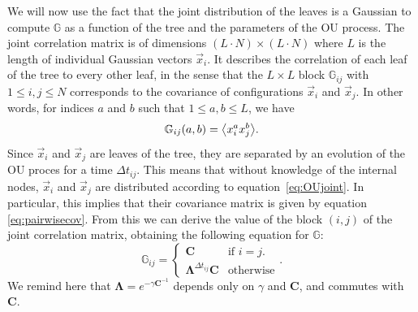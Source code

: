\documentclass[preprint,amsmath,amssymb,superscriptaddress,showpacs,pre]{revtex4-1}
\let\originalleft\left
\let\originalright\right
\renewcommand{\left}{\mathopen{}\mathclose\bgroup\originalleft}
\renewcommand{\right}{\aftergroup\egroup\originalright}
\def\vx{\vec x}
\newcommand{\Lam}{\bm{\Lambda}}
\newcommand{\iC}{\bm{C}^{-1}}
\newcommand{\av}[1]{\left\langle #1 \right\rangle}
\begin{document}
We will now use the fact that the joint distribution of the leaves is a Gaussian to compute $\mathbb{G}$ as a function of the tree and the parameters of the OU process.
The joint correlation matrix is of dimensions $(L\cdot N)\times(L\cdot N)$ where $L$ is the length of individual Gaussian vectors $\vx_i$. 
It describes the correlation of each leaf of the tree to every other leaf, in the sense that the $L\times L$ block $\mathbb{G}_{ij}$ with $1\leq i,j\leq N$ corresponds to the covariance of configurations $\vx_i$ and $\vx_j$. 
In other words, for indices $a$ and $b$ such that $1\leq a,b\leq L$, we have
\begin{equation}
	\mathbb{G}_{ij}(a,b) = \av{x_i^a x_j^b}. 
	\label{eq:jointcov_1}
\end{equation}
Since $\vx_i$ and $\vx_j$ are leaves of the tree, they are separated by an evolution of the OU proces for a time $\Delta t_{ij}$.
This means that without knowledge of the internal nodes, $\vx_i$ and $\vx_j$ are distributed according to equation~\ref{eq:OUjoint}. 
In particular, this implies that their covariance matrix is given by equation \ref{eq:pairwisecov}.
From this we can derive the value of the block $(i,j)$ of the joint correlation matrix, obtaining the following equation for $\mathbb{G}$: 
\begin{equation}
	\mathbb{G}_{ij} =
	\begin{cases}
		\bm C & \text{if $i=j$}.\\
		\Lam^{\Delta t_{ij}}{\mathbf{C}} & \text{otherwise}  
	\end{cases}.
	\label{eq:jointcov_2}
\end{equation}
We remind here that $\Lam = e^{-\gamma\iC}$ depends only on $\gamma$ and $\mathbf{C}$, and commutes with $\mathbf{C}$.  \\
\end{document}
